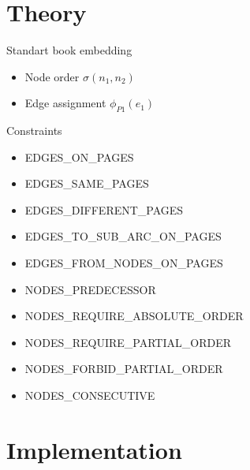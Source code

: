 \documentclass[11pt]{beamer}
\begin{document}
    \section{Theory}\label{sec:theoretical}
    \begin{frame}{Standart book embedding\cite{Bekos2015}}
        \begin{itemize}
            \item Node order $\sigma(n_1,n_2)$
            \item Edge assignment $\phi_{P1}(e_1)$
        \end{itemize}
    \end{frame}

    \begin{frame}{Constraints}
        \begin{itemize}
            \item EDGES\_ON\_PAGES
            \item EDGES\_SAME\_PAGES
            \item EDGES\_DIFFERENT\_PAGES
            \item \alert<2>{EDGES\_TO\_SUB\_ARC\_ON\_PAGES}
            \item EDGES\_FROM\_NODES\_ON\_PAGES
            \item \alert<2>{NODES\_PREDECESSOR}
            \item NODES\_REQUIRE\_ABSOLUTE\_ORDER
            \item NODES\_REQUIRE\_PARTIAL\_ORDER
            \item NODES\_FORBID\_PARTIAL\_ORDER
            \item NODES\_CONSECUTIVE
        \end{itemize}
    \end{frame}

    \section{Implementation}\label{sec:implementation}
\end{document}
